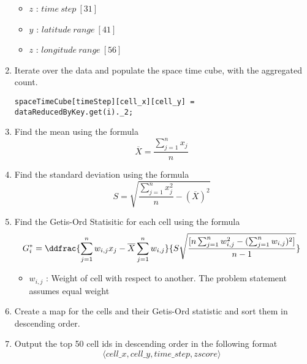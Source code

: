 \begin{enumerate}
\begin{itemize}
\item $z$ : $time\ step\ [31]$
\item $y$ : $latitude\ range\ [41]$
\item $z$ : $longitude\ range\ [56]$
\end{itemize}
\item Iterate over the data and populate the space time cube, with the aggregated count.
\begin{verbatim}
spaceTimeCube[timeStep][cell_x][cell_y] = dataReducedByKey.get(i)._2;
\end{verbatim}
\item Find the mean using the formula
\begin{equation*}
\overline{X} = \frac{\sum_{j=1}^{n}x_{j}}{n}
\end{equation*}
\item Find the standard deviation using the formula
\begin{equation*}
S = \sqrt{\frac{\sum_{j=1}^{n}x_{j}^{2}}{n} - (\overline{X})^{2}}
\end{equation*}
\item Find the Getis-Ord Statisitic for each cell using the formula
\begin{equation*}
G_{i}^{*} = \ddfrac{\sum_{j=1}^{n}w_{i,j} x_{j} - \overline{X}\sum_{j=1}^{n}w_{i,j}}{S\sqrt{\frac{[n\sum_{j=1}^{n}w_{i,j}^{2} - (\sum_{j=1}^{n}w_{i,j})^{2}]}{n-1}}}
\end{equation*}
\begin{itemize}
\item $w_{i,j}$ : Weight of cell with respect to another. The problem statement assumes equal weight
\end{itemize}
\item Create a map for the cells and their Getis-Ord statistic and sort them in descending order.
\item Output the top 50 cell ids in descending order in the following format
\begin{equation*}
\langle cell\_x, cell\_y, time\_step, zscore \rangle
\end{equation*}
\end{enumerate}